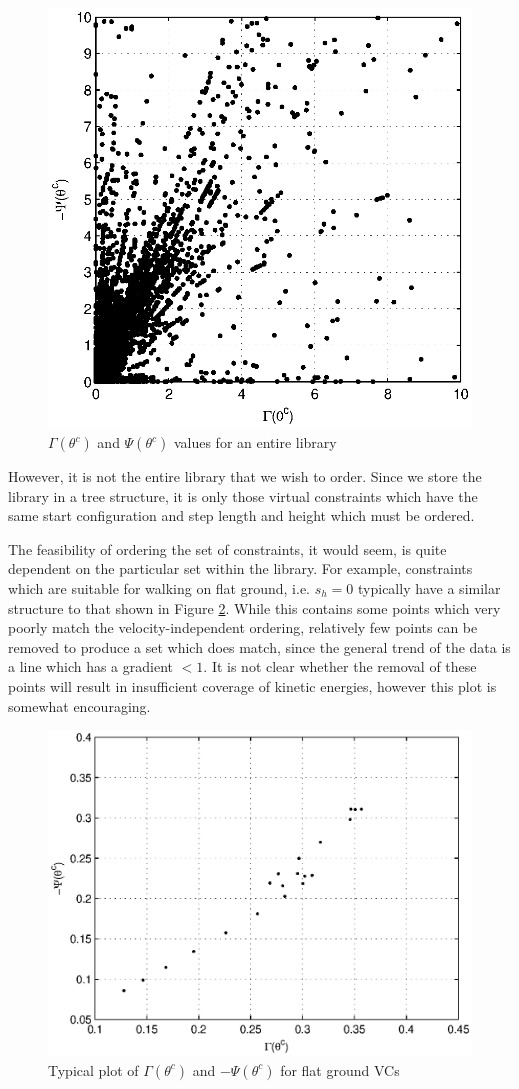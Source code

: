 \begin{figure}
\centering
\includegraphics[width=0.8\linewidth]{7Results/GammaPsiAll}
\caption{$\Gamma(\theta^c)$ and $\Psi(\theta^c)$ values for an entire library}
\label{fig:GammaPsiAll}
\end{figure}

However, it is not the entire library that we wish to order. Since we store the library in a tree structure, it is only those virtual constraints which have the same start configuration and step length and height which must be ordered.

The feasibility of ordering the set of constraints, it would seem, is quite dependent on the particular set within the library. For example, constraints which are suitable for walking on flat ground, i.e. $s_h=0$ typically have a similar structure to that shown in Figure \ref{fig:GPFlat}. While this contains some points which very poorly match the velocity-independent ordering, relatively few points can be removed to produce a set which does match, since the general trend of the data is a line which has a gradient $<1$. It is not clear whether the removal of these points will result in insufficient coverage of kinetic energies, however this plot is somewhat encouraging.

\begin{figure}
\centering
\includegraphics[width=0.8\linewidth]{7Results/GPFlat}
\caption{Typical plot of $\Gamma(\theta^c)$ and $-\Psi(\theta^c)$ for flat ground VCs}
\label{fig:GPFlat}
\end{figure}

